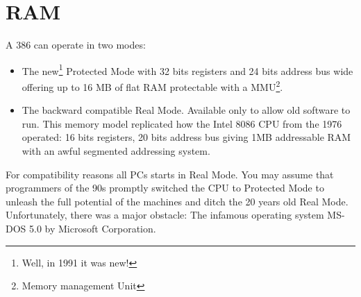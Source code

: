 \documentclass[book.tex]{subfiles}
\begin{document}
\section{RAM}
A 386 can operate in two modes:\\
\par
\begin{itemize}
  \item The new\footnote{Well, in 1991 it was new!} Protected Mode with  32 bits registers and 24 bits address bus wide offering up to 16 MB of flat RAM protectable with a MMU\footnote{Memory management Unit}.
  \item The backward compatible Real Mode. Available only to allow old software to run. This memory model replicated how the Intel 8086 CPU from the 1976 operated: 16 bits registers, 20 bits address bus giving 1MB addressable RAM with an awful segmented addressing system. 
\end{itemize}
For compatibility reasons all PCs starts in Real Mode. You may assume that programmers of the 90s promptly switched the CPU to Protected Mode to unleash the full potential of the machines and ditch the 20 years old Real Mode. Unfortunately, there was a major obstacle: The infamous operating system MS-DOS 5.0 by Microsoft Corporation.
  
\end{document}
